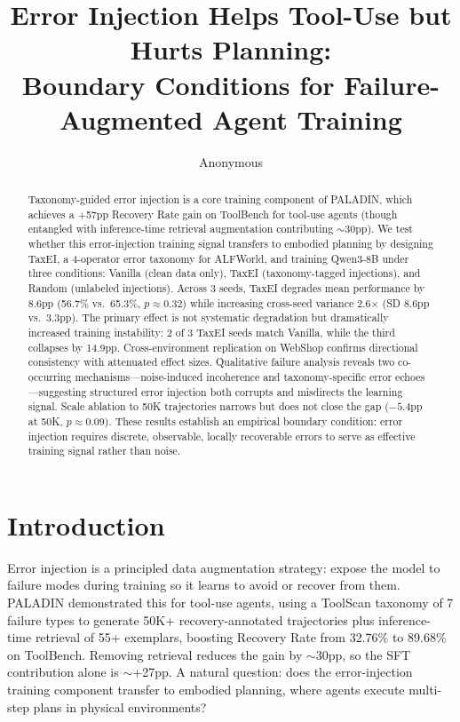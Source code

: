 \documentclass[11pt,a4paper]{article}
\title{Error Injection Helps Tool-Use but Hurts Planning:\\Boundary Conditions for Failure-Augmented Agent Training}
\author{Anonymous}
\date{}
\begin{document}
\maketitle

\begin{abstract}
Taxonomy-guided error injection is a core training component of PALADIN, which achieves a +57pp Recovery Rate gain on ToolBench for tool-use agents (though entangled with inference-time retrieval augmentation contributing $\sim$30pp). We test whether this error-injection training signal transfers to embodied planning by designing TaxEI, a 4-operator error taxonomy for ALFWorld, and training Qwen3-8B under three conditions: Vanilla (clean data only), TaxEI (taxonomy-tagged injections), and Random (unlabeled injections). Across 3 seeds, TaxEI degrades mean performance by 8.6pp (56.7\% vs.\ 65.3\%, $p \approx 0.32$) while increasing cross-seed variance 2.6$\times$ (SD 8.6pp vs.\ 3.3pp). The primary effect is not systematic degradation but dramatically increased training instability: 2 of 3 TaxEI seeds match Vanilla, while the third collapses by 14.9pp. Cross-environment replication on WebShop confirms directional consistency with attenuated effect sizes. Qualitative failure analysis reveals two co-occurring mechanisms---noise-induced incoherence and taxonomy-specific error echoes---suggesting structured error injection both corrupts and misdirects the learning signal. Scale ablation to 50K trajectories narrows but does not close the gap ($-5.4$pp at 50K, $p \approx 0.09$). These results establish an empirical boundary condition: error injection requires discrete, observable, locally recoverable errors to serve as effective training signal rather than noise.
\end{abstract}

\section{Introduction}
\label{sec:intro}

Error injection is a principled data augmentation strategy: expose the model to failure modes during training so it learns to avoid or recover from them. PALADIN \citep{paladin2025} demonstrated this for tool-use agents, using a ToolScan taxonomy of 7 failure types to generate 50K+ recovery-annotated trajectories plus inference-time retrieval of 55+ exemplars, boosting Recovery Rate from 32.76\% to 89.68\% on ToolBench. Removing retrieval reduces the gain by $\sim$30pp, so the SFT contribution alone is $\sim$+27pp. A natural question: does the error-injection training component transfer to embodied planning, where agents execute multi-step plans in physical environments?
\end{document}
